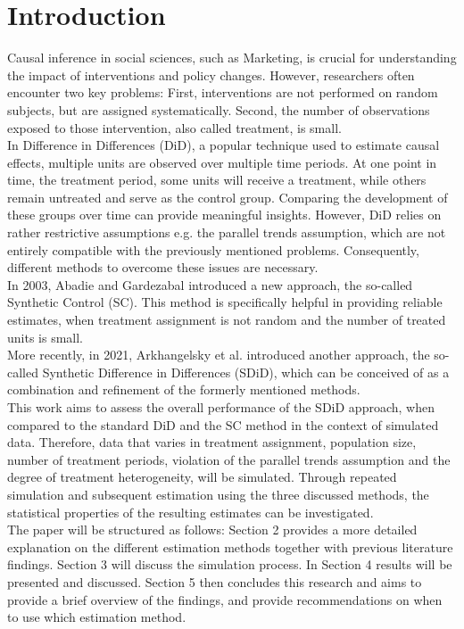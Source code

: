 \documentclass[8pt]{article}
\begin{document}
\section{Introduction}
Causal inference in social sciences, such as Marketing, is crucial for understanding the impact of interventions and policy changes. However, researchers often encounter two key problems: First, interventions are not performed on random subjects, but are assigned systematically. Second, the number of observations exposed to those intervention, also called treatment, is small. \\
In Difference in Differences (DiD), a popular technique used to estimate causal effects, multiple units are observed over multiple time periods. At one point in time, the treatment period, some units will receive a treatment, while others remain untreated and serve as the control group. Comparing the development of these groups over time can provide meaningful insights. However, DiD relies on rather restrictive assumptions e.g. the parallel trends assumption, which are not entirely compatible with the previously mentioned problems. Consequently, different methods to overcome these issues are necessary. \\
In 2003, Abadie and Gardezabal introduced a new approach, the so-called Synthetic Control (SC). This method is specifically helpful in providing reliable estimates, when treatment assignment is not random and the number of treated units is small. \\
More recently, in 2021, Arkhangelsky et al. introduced another approach, the so-called Synthetic Difference in Differences (SDiD), which can be conceived of as a combination and refinement of the formerly mentioned methods. \\
This work aims to assess the overall performance of the SDiD approach, when compared to the standard DiD and the SC method in the context of simulated data. Therefore, data that varies in treatment assignment, population size, number of treatment periods, violation of the parallel trends assumption and the degree of treatment heterogeneity, will be simulated. Through repeated simulation and subsequent estimation using the three discussed methods, the statistical properties of the resulting estimates can be investigated. \\
The paper will be structured as follows: Section 2 provides a more detailed explanation on the different estimation methods together with previous literature findings. Section 3 will discuss the simulation process. In Section 4 results will be presented and discussed. Section 5 then concludes this research and aims to provide a brief overview of the findings, and provide recommendations on when to use which estimation method.
\end{document}

